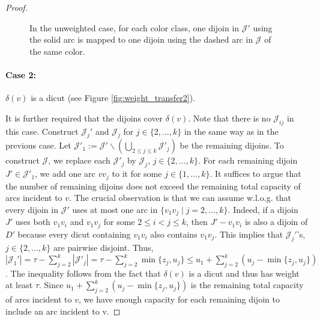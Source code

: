 \documentclass[10pt,a4paper]{amsart}
\begin{document}
\begin{proof}
\begin{figure}[htbp]
  \caption{In the unweighted case, for each color class, one dijoin in $\mathcal{J}'$ using the solid arc is mapped to one dijoin using the dashed arc in $\mathcal{J}$ of the same color.}
  \label{fig:weight_transfer1}
\end{figure}

    \paragraph{\textbf{Case 2}:} $\delta(v)$ is a dicut (see Figure \ref{fig:weight_transfer2}). 
    
    It is further required that the dijoins cover $\delta(v)$. 
    Note that there is no $\mathcal{J}_{ij}$ in this case.
    Construct $\mathcal{J}_{j}'$ and $\mathcal{J}_{j}$ for $j\in\{2,...,k\}$ in the same way as in the previous case. Let $\mathcal{J}'_1:=\mathcal{J}'\backslash(\bigcup_{2\leq j\leq k} \mathcal{J}'_j)$
    be the remaining dijoins. To construct $\mathcal{J}$, we replace each $\mathcal{J}'_j$ by $\mathcal{J}_j$, $j\in\{2,...,k\}$. For each remaining dijoin $J'\in \mathcal{J}'_1$, we add one arc $vv_j$ to it for some $j\in \{1,...,k\}$. It suffices to argue that the number of remaining dijoins does not exceed the remaining total capacity of arcs incident to $v$.
    The crucial observation is that we can assume w.l.o.g. that every dijoin in $\mathcal{J}'$ uses at most one arc in $\{v_1v_j\mid j=2,...,k\}$. Indeed, if a dijoin $J'$ uses both $v_1v_i$ and $v_1v_j$ for some $2\leq i<j\leq k$, then $J'-v_1v_i$ is also a dijoin of $D'$ because every dicut containing $v_1v_i$ also contains $v_1v_j$. This implies that $\mathcal{J}_j'$'s, $j\in\{2,...,k\}$ are pairwise disjoint.
    Thus, $|\mathcal{J}_1'|=\tau-\sum_{j=2}^k |\mathcal{J}'_j|=\tau-\sum_{j=2}^k \min\{z_j, u_j\}\leq u_1+\sum_{j=2}^k (u_j-\min\{z_j, u_j\})$. The inequality follows from the fact that $\delta(v)$ is a dicut and thus has weight at least $\tau$. Since $u_1+\sum_{j=2}^k (u_j-\min\{z_j, u_j\})$ is the remaining total capacity of arcs incident to $v$, we have enough capacity for each remaining dijoin to include an arc incident to v. 
    
    \end{proof}
\end{document}
